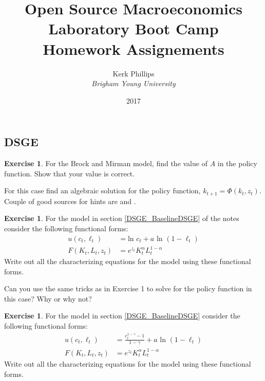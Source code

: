 \documentclass[letterpaper,12pt]{article}
\theoremstyle{definition}
\newtheorem{exercise}[theorem]{Exercise}
\begin{document}
\begin{titlepage}
	\title{Open Source Macroeconomics Laboratory Boot Camp \\ Homework Assignements}  %
	\author{Kerk Phillips\\ \emph{Brigham Young University}}
	\date{\LARGE{2017}}
	\maketitle
\end{titlepage}

\begin{spacing}{1.5}


\section*{DSGE}\label{DSGE_HW}

	\begin{exercise} \label{DSGE_HW_BM_FindA}
		For the Brock and Mirman model, find the value of $A$ in the policy function.  Show that your value is correct.

		For this case find an algebraic solution for the policy function, $k_{t+1} = \Phi (k_t,z_t)$.  Couple of good sources for hints are \citet[exercise 2.2, p. 12]{StokeyLucas1989} and \citet[exercise 1.1, p. 47]{Sargent1987}.
	\end{exercise}

	\begin{exercise} \label{DSGE_HW_CharEq_Ln}
		For the model in section \ref{DSGE_BaselineDSGE} of the notes consider the following functional forms:
		\begin{equation}\label{DSGE_HW_CharEq_Ln_eq01}
		\begin{split}
		u(c_t,\ell_t) & = \text{ln }c_t + a \text{ ln }(1-\ell_t)\\
		F(K_t,L_t,z_t) & = e^{z_t}K^{\alpha}_t L^{1-\alpha}_t  \nonumber
		\end{split}
		\end{equation}
		Write out all the characterizing equations for the model using these functional forms.

		Can you use the same tricks as in Exercise 1 to solve for the policy function in this case?  Why or why not?
	\end{exercise}

	\begin{exercise} \label{DSGE_HW_CharEq_CES_Ln}
		For the model in section \ref{DSGE_BaselineDSGE} consider the following functional forms:
		\begin{equation}\label{DSGE_HW_CharEq_CES_Ln_eq01}
		\begin{split}
		u(c_t,\ell_t) & = \frac{c^{1-\gamma}_t -1}{1-\gamma}+ a \text{ ln }(1-\ell_t)\\
		F(K_t,L_t,z_t) & = e^{z_t}K^{\alpha}_t L^{1-\alpha}_t  \nonumber
		\end{split}
		\end{equation}
		Write out all the characterizing equations for the model using these functional forms.
	\end{exercise}


\end{spacing}
\end{document}
